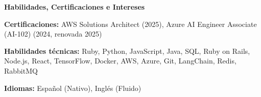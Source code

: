 \documentclass[11pt]{article}
\begin{document}
\vspace{12pt}

\begin{center}
    \textbf{Habilidades, Certificaciones e Intereses}
\end{center}

\textbf{Certificaciones:} AWS Solutions Architect (2025), Azure AI Engineer Associate (AI-102) (2024, renovada 2025)

\textbf{Habilidades técnicas:} Ruby, Python, JavaScript, Java, SQL, Ruby on Rails, Node.js, React, TensorFlow, Docker, AWS, Azure, Git, LangChain, Redis, RabbitMQ

\textbf{Idiomas:} Español (Nativo), Inglés (Fluido)
\end{document}
